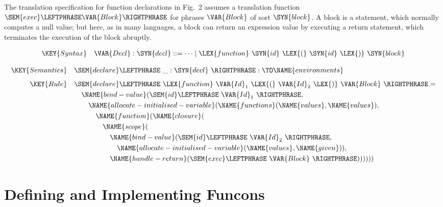 The translation specification for function declarations in Fig.~2
assumes a translation function $\SEM{exec}\LEFTPHRASE \VAR{Block} \RIGHTPHRASE$ 
for phrases $\VAR{Block}$ of sort $\SYN{block}$.
A block is a statement, which normally computes a null value;
but here, as in many languages, a block can return an expression value by executing a return statement,
which terminates the execution of the block abruptly.


\begin{align*}
  \KEY{Syntax} \quad
    \VAR{Decl} : \SYN{decl}
      ::= \cdots \mid 
      \LEX{function} \ \SYN{id} \ \LEX{(} \ \SYN{id} \ \LEX{)} \ \SYN{block}
\end{align*}



\begin{align*}
  \KEY{Semantics} \quad
  & \SEM{declare} \LEFTPHRASE \ \_ : \SYN{decl} \ \RIGHTPHRASE  
    :  \TO \NAME{environments} 
\\[1ex]
  \KEY{Rule} \quad
    & \SEM{declare} \LEFTPHRASE \
        \LEX{function} \ \VAR{Id}_1 \ \LEX{(} \ \VAR{Id}_2 \ \LEX{)} \ \VAR{Block} \
                          \RIGHTPHRASE  = \\&\quad
      \NAME{bind-value}
        ( \SEM{id} \LEFTPHRASE \ \VAR{Id}_1 \ \RIGHTPHRASE , \\&\quad\quad
               \NAME{allocate-initialised-variable}
                (  \NAME{functions}
                        (  \NAME{values}, 
                           \NAME{values} ),
                    \\&\quad\quad\quad
               \NAME{function} 
                ( \NAME{closure}
                  ( \\&\quad\quad\quad\quad \NAME{scope}
                          ( \\&\quad\quad\quad\quad\quad \NAME{bind-value}
                                  (  \SEM{id} \LEFTPHRASE \ \VAR{Id}_2 \ \RIGHTPHRASE ,\\&\quad\quad\quad\quad\quad\quad
                            \NAME{allocate-initialised-variable}
                (  \NAME{values}, 
                                  \NAME{given} ) ), \\&\quad\quad\quad\quad\quad
                                 \NAME{handle-return}
                                  (  \SEM{exec} \LEFTPHRASE \ \VAR{Block} \ \RIGHTPHRASE  ) ) ) ) )
                    )
\end{align*}


\section*{Defining and Implementing Funcons}

